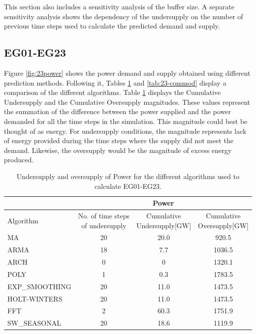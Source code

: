 \documentclass[11pt,letterpaper]{article}
\begin{document}
This section also includes a sensitivity analysis of the buffer size. A separate sensitivity analysis shows the dependency of the undersupply on the number of previous time steps used to calculate the predicted demand and supply.

\subsection{EG01-EG23}

Figure \ref{fig:23power} shows the power demand and supply obtained using different prediction methods. Following it, Tables \ref{tab:23-power} and \ref{tab:23-commod} display a comparison of the different algorithms. Table \ref{tab:23-power} displays the Cumulative Undersupply and the Cumulative Oversupply magnitudes. These values represent the summation of the difference between the power supplied and the power demanded for all the time steps in the simulation. This magnitude could best be thought of as energy. For undersupply conditions, the magnitude represents lack of energy provided during the time steps where the supply did not meet the demand. Likewise, the oversupply would be the magnitude of excess energy produced.

\begin{table}[]
	\centering
	\caption {Undersupply and oversupply of Power for the different algorithms used to calculate EG01-EG23.}
	\label{tab:23-power}
	\begin{tabular}{|l|c|c|c|}
		\hline
		& \multicolumn{3}{c|}{Power} \\ \hline
		Algorithm & \shortstack{No. of time steps\\of undersupply}  & 
		\shortstack{Cumulative\\Undersupply[GW]}  & \shortstack{Cumulative\\Oversupply[GW]} \\ \hline
		MA        & 20 	& 20.0  &  920.5   \\ \hline
		ARMA      & 18 	&  7.7  &  1036.5  \\ \hline
		ARCH      &  0 	&   0  	&  1320.1  \\ \hline
		POLY      &  1 	&  0.3 	&  1783.5  \\ \hline
		EXP\_SMOOTHING 	& 20 	& 11.0 & 1473.5 \\ \hline
		HOLT-WINTERS  	& 20 	& 11.0 & 1473.5 \\ \hline
		FFT       & 2 	& 60.3 	& 1751.9 	\\ \hline
		SW\_SEASONAL    & 20 	& 18.6 	& 1119.9 	\\ \hline
	\end{tabular}
\end{table}
\end{document}
